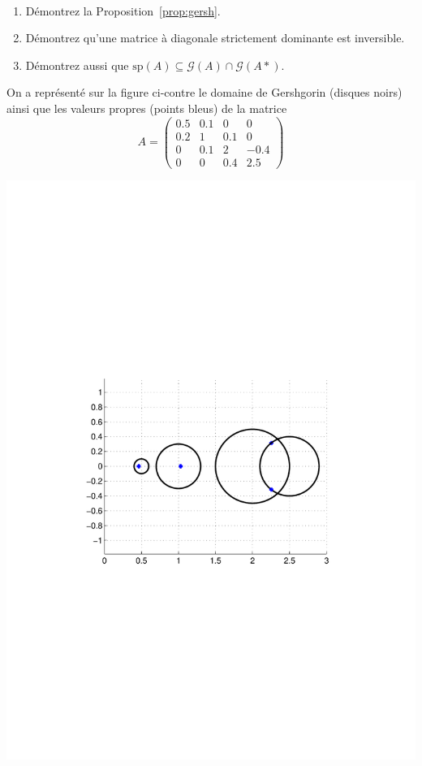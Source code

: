 \begin{exercice}$ $
\begin{enumerate}
\item Démontrez la Proposition~\ref{prop:gersh}.
\item Démontrez qu'une matrice à diagonale strictement dominante est inversible.
\item Démontrez aussi que $\mathrm{sp}(A) \subseteq \mathcal G(A) \cap \mathcal
		G(A*)$.
\end{enumerate}
\end{exercice}

\begin{minipage}{0.45\columnwidth}
On a représenté sur la figure ci-contre le domaine de Gershgorin (disques
noirs) ainsi que les valeurs propres (points bleus) de la matrice
\[
A = \left(\begin{array}{cccc}
0.5 & 0.1 & 0 & 0\\
0.2 & 1 & 0.1 & 0\\
0 & 0.1& 2 & -0.4 \\
0 & 0 & 0.4 & 2.5
\end{array}\right)
\]
\end{minipage}
\hspace{0.05 \columnwidth}
\begin{minipage}{0.45\columnwidth}
\includegraphics[width = \columnwidth]{gersh.pdf}
\end{minipage}

